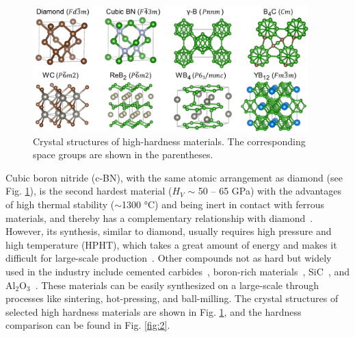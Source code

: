     \begin{figure}[t]
        \centering
        \captionsetup{singlelinecheck = false, justification=justified}
        \includegraphics[width=0.95\textwidth]{selected_crystals.png}
        \caption[Crystal structures of materials with high hardness.]{Crystal structures of high-hardness materials. The corresponding space groups are shown in the parentheses.}
        \label{fig:1}
    \end{figure}

Cubic boron nitride (c-BN), with the same atomic arrangement as diamond (see Fig. \ref{fig:1}), is the second hardest material ($H_V$ $\sim$ 50 – 65 GPa) with the advantages of high thermal stability ($\sim$1300 °C) \cite{yu2006thermal,cBN_65_GPa_liu2019hardness} and being inert in contact with ferrous materials, and thereby has a complementary relationship with diamond~\cite{monteiro2013cubic}. However, its synthesis, similar to diamond, usually requires high pressure and high temperature (HPHT), which takes a great amount of energy and makes it difficult for large-scale production~\cite{zhao2016recent}. Other compounds not as hard but widely used in the industry include
cemented carbides~\cite{sun2020review,wu2013understanding}, boron-rich materials~\cite{kovziridze2013improvement,sairam2012development,jiao2010synthesis}, SiC~\cite{sung1996carbon}, and Al$_2$O$_3$~\cite{acchar2005tem}. These materials can be easily synthesized on a large-scale through processes like sintering, hot-pressing, and ball-milling. The  crystal structures of selected high hardness materials are shown in Fig. \ref{fig:1}, and the hardness comparison can be found in Fig. \ref{fig:2}.

